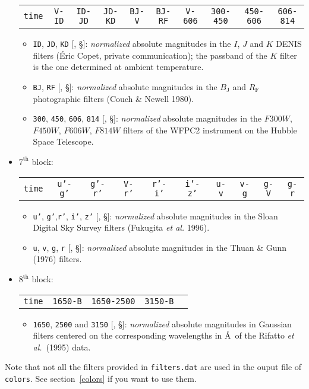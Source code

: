 \documentclass[11pt,draft,fleqn]{article}
\begin{document}
\begin{itemize}
\begin{tabular}{@{}cccccccccc}
 \texttt{time} &    \texttt{V-ID} &   \texttt{ID-JD} &   \texttt{JD-KD} &    \texttt{BJ-V} &  \texttt{BJ-RF} &   \texttt{V-606} &  \texttt{300-450} & \texttt{450-606} & \texttt{606-814}
\end{tabular}
\begin{itemize}
\item \texttt{ID}, \texttt{JD}, \texttt{KD} [\ddag, \S]: \emph{normalized} absolute
magnitudes in the $I$, $J$ and $K$ DENIS filters
(\'Eric Copet, private communication); the passband of the $K$ filter
is the one determined at ambient temperature.
\item \texttt{BJ}, \texttt{RF} [\ddag, \S]: \emph{normalized} absolute
magnitudes in the $B_{\mathrm{J}}$ and $R_{\mathrm{F}}$
photographic filters (Couch \& Newell 1980).
\item \texttt{300}, \texttt{450}, \texttt{606}, \texttt{814} [\ddag,
\S]: \emph{normalized} absolute
magnitudes in the 
$F300W$, $F450W$, $F606W$, $F814W$ filters of the WFPC2 instrument on the Hubble Space Telescope.
\end{itemize}
\item $7^{\mathrm{th}}$ block:
\begin{tabular}{@{}cccccccccc}
 \texttt{time} &   \texttt{u'-g'} &   \texttt{g'-r'} &    \texttt{V-r'} &   \texttt{r'-i'} &   \texttt{i'-z'} &    \texttt{u-v} &     \texttt{v-g} &     \texttt{g-V} &     \texttt{g-r}
\end{tabular}
\begin{itemize}
\item\texttt{u'}, \texttt{g'},\texttt{r'}, \texttt{i'}, \texttt{z'}
[\ddag, \S]: \emph{normalized} absolute
magnitudes in the 
Sloan Digital Sky Survey filters (Fukugita \emph{et al.} 1996).
\item \texttt{u}, \texttt{v}, \texttt{g}, 
\texttt{r} [\ddag, \S]: \emph{normalized} absolute
magnitudes in the Thuan \&
Gunn (1976) filters.
\end{itemize}
\item $8^{\mathrm{th}}$ block:
\begin{tabular}{@{}ccccc}
\texttt{time} & \texttt{1650-B} & \texttt{1650-2500} & \texttt{3150-B}
\end{tabular}
\begin{itemize}
\item[]\texttt{1650}, \texttt{2500} and \texttt{3150} [\ddag, \S]: \emph{normalized} absolute
magnitudes in Gaussian filters centered on the 
corresponding wavelengths in \AA\ of the Rifatto \emph{et al.}\ (1995) data.
\end{itemize}
\end{itemize}
Note that not all the filters provided in \texttt{filters.dat} are
used in the ouput file of \texttt{colors}. See section~\ref{colors}
if you want to use them.
\end{document}

